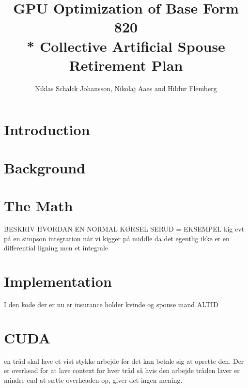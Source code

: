 \documentclass[oribibl]{llncs}
\title{GPU Optimization of Base Form 820 \\* Collective Artificial Spouse Retirement Plan}
\author{Niklas Schalck Johansson, Nikolaj Aaes and Hildur Flemberg\\
\email{\{nsjo, niaa, hufl\}@itu.dk}}
\institute{IT University of Copenhagen}
\begin{document}
	\maketitle
	\tableofcontents
	
	
	\begin{abstract}
		
		\label{abstract}
	\end{abstract}
	
	\section{Introduction}
	
	
	\label{introduction}
		
	\section{Background}
		
	
	\label{background}
		
	\section{The Math}
		
	
	\label{themath}
	
	BESKRIV HVORDAN EN NORMAL KØRSEL SERUD = EKSEMPEL
	kig evt på en simpson integration når vi kigger på middle da det egentlig ikke er en differential ligning men et integrale
		
	\section{Implementation}

	
	\label{implementation}
	I den kode der er nu er insurance holder kvinde og spouse mand ALTID
		
	\section{CUDA}
en tråd skal lave et vist stykke arbejde før det kan betale sig at oprette den. Der er overhead for at lave context for hver tråd så hvis den arbejde tråden laver er mindre end at sætte overheaden op, giver det ingen mening.
\end{document}
